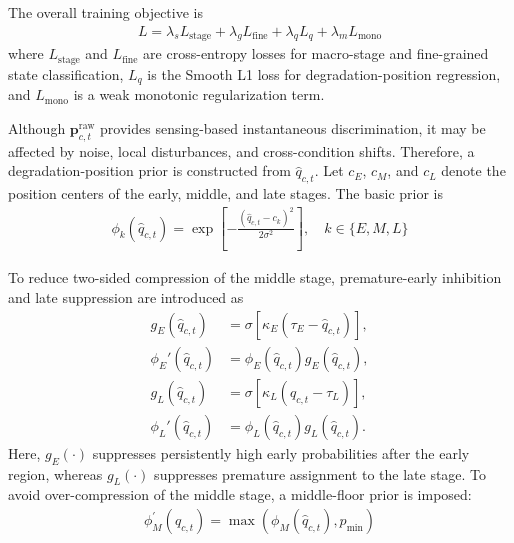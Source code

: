 \documentclass[a4paper,fleqn]{cas-sc}
\begin{document}
  The overall training objective is
  \begin{equation}
    \begin{aligned}
      L=\lambda_{s}L_{\mathrm{stage}}+\lambda_{g}L_{\mathrm{fine}}+\lambda_{q}L_q+\lambda_{m}L_{\mathrm{mono}}
    \end{aligned}
  \end{equation}
  where $L_{\mathrm{stage}}$ and $L_{\mathrm{fine}}$ are cross-entropy losses for macro-stage and fine-grained state classification, $L_q$ is the Smooth L1 loss for degradation-position regression, and $L_{\mathrm{mono}}$ is a weak monotonic regularization term.

  Although $\mathbf{p}_{c,t}^{\mathrm{raw}}$ provides sensing-based instantaneous discrimination, it may be affected by noise, local disturbances, and cross-condition shifts. Therefore, a degradation-position prior is constructed from $\hat{q}_{c,t}$. Let $c_{E}$, $c_{M}$, and $c_{L}$ denote the position centers of the early, middle, and late stages. The basic prior is
  \begin{equation}
    \begin{aligned}
      \phi_k(\hat{q}_{c,t})
      =
      \exp\left[
      -\frac{(\hat{q}_{c,t}-c_k)^2}{2\sigma^2}
      \right],\quad k\in\{E,M,L\}
    \end{aligned}
  \end{equation}
  
  To reduce two-sided compression of the middle stage, premature-early inhibition and late suppression are introduced as
  \begin{equation}
 	\begin{aligned}
 		g_E(\hat{q}_{c,t})
 		&=
 		\sigma\!\left[\kappa_E(\tau_E-\hat{q}_{c,t})\right],\\
 		\phi_E'(\hat{q}_{c,t})
 		&=
 		\phi_E(\hat{q}_{c,t})g_E(\hat{q}_{c,t}),\\
 		g_L(\hat{q}_{c,t})
 		&=
 		\sigma\!\left[\kappa_L(\hat{q}_{c,t}-\tau_L)\right],\\
 		\phi_L'(\hat{q}_{c,t})
 		&=
 		\phi_L(\hat{q}_{c,t})g_L(\hat{q}_{c,t}).
 	\end{aligned}
 	\label{eq:dual_side_inhibition}
   \end{equation}
  Here, $g_{E}(\cdot )$ suppresses persistently high early probabilities after the early region, whereas $g_{L}(\cdot )$ suppresses premature assignment to the late stage. To avoid over-compression of the middle stage, a middle-floor prior is imposed:
  \begin{equation}
    \begin{aligned}
      \phi_{M}^{'}(\hat{q}_{c,t})=\max(\phi_{M}(\hat{q}_{c,t}),p_{\min})
    \end{aligned}
  \end{equation}
  
\end{document}
